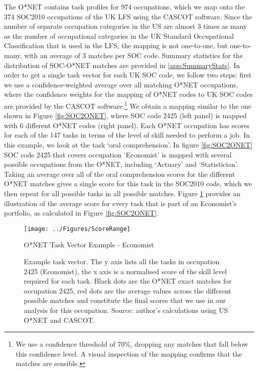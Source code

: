\documentclass[12pt,authoryear]{elsarticle}
\begin{document}
	The O*NET contains task profiles for 974 occupations, which we map onto the 374 SOC2010 occupations of the UK LFS using the CASCOT software. Since the number of separate occupation categories in the US are almost 3 times as many as the number of occupational categories in the UK Standard Occupational Classification that is used in the LFS, the mapping is not one-to-one, but one-to-many, with an average of 3 matches per SOC code. Summary statistics for the distribution of SOC-O*NET matches are provided in \ref{app:SummaryStats}. In order to get a single task vector for each UK SOC code, we follow two steps: first we use a confidence-weighted average over all matching O*NET occupations, where the confidence weights for the mapping of O*NET codes to UK SOC codes are provided by the CASCOT software.\footnote{We use a confidence threshold of 70\%, dropping any matches that fall below this confidence level. A visual inspection of the mapping confirms that the matches are sensible.} We obtain a mapping similar to the one shown in Figure \ref{fig:SOC2ONET}, where SOC code 2425 (left panel) is mapped with 6 different O*NET codes (right panel). Each O*NET occupation has scores for each of the 147 tasks in terms of the level of skill needed to perform a job. In this example, we look at the task `oral comprehension'. In figure \ref{fig:SOC2ONET} SOC code 2425 that covers occupation `Economist' is mapped with several possible occupations from the O*NET, including `Actuary' and `Statistician'. Taking an average over all of the oral comprehension scores for the different O*NET matches gives a single score for this task in the SOC2010 code, which we then repeat for all possible tasks in all possible matches. Figure \ref{fig:ONETScoreRange} provides an illustration of the average score for every task that is part of an Economist's portfolio, as calculated in Figure \ref{fig:SOC2ONET}.
	
	\begin{landscape}
		\begin{figure}[h!]
			\centering
			\texttt{[image: ../Figures/ScoreRange]}
			\caption{O*NET Task Vector Example - Economist}
			\caption*{\footnotesize{Example task vector. The y axis lists all the tasks in occupation 2425 (Economist), the x axis is a normalised score of the skill level required for each task. Black dots are the O*NET exact matches for occupation 2425, red dots are the average values across the different possible matches and constitute the final scores that we use in our analysis for this occupation. Source: author's calculations using US O*NET and CASCOT.}}
			\label{fig:ONETScoreRange}
		\end{figure}
	\end{landscape}
	
\end{document}

